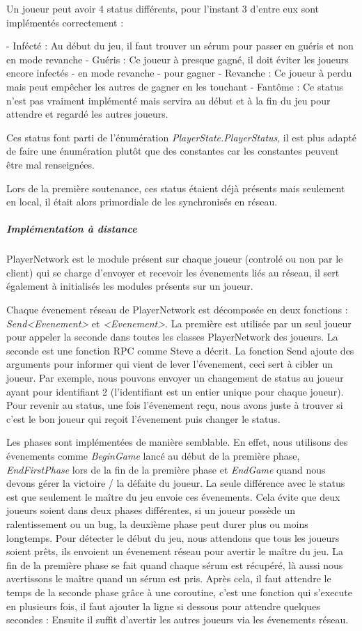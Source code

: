 \documentclass{article}
\begin{document}
Un joueur peut avoir 4 status différents, pour l'instant 3 d'entre eux sont implémentés correctement :

- Infécté : Au début du jeu, il faut trouver un sérum pour passer en guéris et non en mode revanche
- Guéris : Ce joueur à presque gagné, il doit éviter les joueurs encore infectés - en mode revanche - pour gagner
- Revanche : Ce joueur à perdu mais peut empêcher les autres de gagner en les touchant
- Fantôme : Ce status n'est pas vraiment implémenté mais servira au début et à la fin du jeu pour attendre et regardé les autres joueurs.

Ces status font parti de l'énumération \emph{PlayerState.PlayerStatus}, il est plus adapté de faire une énumération plutôt que des constantes car les constantes peuvent être mal renseignées.

Lors de la première soutenance, ces status étaient déjà présents mais seulement en local, il était alors primordiale de les synchronisés en réseau.

\subparagraph{Implémentation à distance}

PlayerNetwork est le module présent sur chaque joueur (controlé ou non par le client) qui se charge d'envoyer et recevoir les évenements liés au réseau, il sert également à initialisés les modules présents sur un joueur.

Chaque évenement réseau de PlayerNetwork est décomposée en deux fonctions : \emph{Send<Evenement>} et \emph{<Evenement>}. La première est utilisée par un seul joueur pour appeler la seconde dans toutes les classes PlayerNetwork des joueurs. La seconde est une fonction RPC comme Steve a décrit. La fonction Send ajoute des arguments pour informer qui vient de lever l'évenement, ceci sert à cibler un joueur. Par exemple, nous pouvons envoyer un changement de status au joueur ayant pour identifiant 2 (l'identifiant est un entier unique pour chaque joueur). Pour revenir au status, une fois l'évenement reçu, nous avons juste à trouver si c'est le bon joueur qui reçoit l'évenement puis changer le status.

Les phases sont implémentées de manière semblable. En effet, nous utilisons des évenements comme \emph{BeginGame} lancé au début de la première phase, \emph{EndFirstPhase} lors de la fin de la première phase et \emph{EndGame} quand nous devons gérer la victoire / la défaite du joueur. La seule différence avec le status est que seulement le maître du jeu envoie ces évenements. Cela évite que deux joueurs soient dans deux phases différentes, si un joueur possède un ralentissement ou un bug, la deuxième phase peut durer plus ou moins longtemps. Pour détecter le début du jeu, nous attendons que tous les joueurs soient prêts, ils envoient un évenement réseau pour avertir le maître du jeu. La fin de la première phase se fait quand chaque sérum est récupéré, là aussi nous avertissons le maître quand un sérum est pris. Après cela, il faut attendre le temps de la seconde phase grâce à une coroutine, c'est une fonction qui s'execute en plusieurs fois, il faut ajouter la ligne si dessous pour attendre quelques secondes :
Ensuite il suffit d'avertir les autres joueurs via les évenements réseau.
\end{document}
